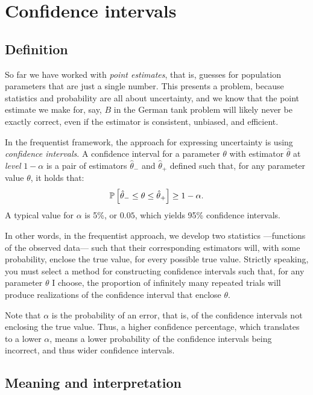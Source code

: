 
\chapter{Confidence intervals}

\section{Definition}

So far we have worked with \emph{point estimates}, that is, guesses for
population parameters that are just a single number. This presents a problem,
because statistics and probability are all about uncertainty, and we know that
the point estimate we make for, say, $B$ in the German tank problem will likely
never be exactly correct, even if the estimator is consistent, unbiased, and
efficient.

In the frequentist framework, the approach for expressing uncertainty is using
\emph{confidence intervals}. A confidence interval for a parameter $\theta$ with estimator $\hat{\theta}$
at \emph{level} $1-\alpha$ is a pair of estimators $\hat{\theta}_-$ and $\hat{\theta}_+$
defined such that, for any parameter value $\theta$, it holds that:
\begin{equation}
  \mathbb{P}\left[{\hat{\theta}_- \leq \theta \leq \hat{\theta}_+}\right] \geq 1 - \alpha.
\end{equation}
A typical value for $\alpha$ is 5\%, or $0.05$, which yields 95\% confidence intervals.

In other words, in the frequentist approach, we develop two statistics ---functions
of the observed data--- such that their corresponding estimators will, with some
probability, enclose the true value, for every possible true value. Strictly speaking,
you must select a method for constructing confidence intervals such that, for any
parameter $\theta$ I choose, the proportion of infinitely many repeated trials will
produce realizations of the confidence interval that enclose $\theta$.

Note that $\alpha$ is the probability of an error, that is, of the confidence intervals not
enclosing the true value. Thus, a higher confidence percentage, which translates to a lower 
$\alpha$, means a lower probability of the
confidence intervals being incorrect, and thus wider confidence intervals.

\section{Meaning and interpretation}

